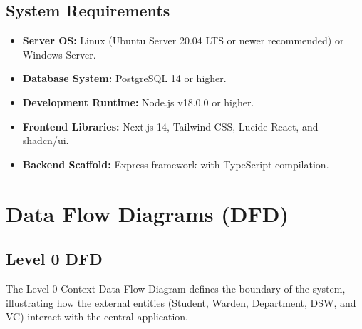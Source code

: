 \documentclass[12pt,a4paper]{article}
\begin{document}
\subsection{System Requirements}
\begin{itemize}
    \item \textbf{Server OS:} Linux (Ubuntu Server 20.04 LTS or newer recommended) or Windows Server.
    \item \textbf{Database System:} PostgreSQL 14 or higher.
    \item \textbf{Development Runtime:} Node.js v18.0.0 or higher.
    \item \textbf{Frontend Libraries:} Next.js 14, Tailwind CSS, Lucide React, and shadcn/ui.
    \item \textbf{Backend Scaffold:} Express framework with TypeScript compilation.
\end{itemize}

\newpage
\section{Data Flow Diagrams (DFD)}

\subsection{Level 0 DFD}
The Level 0 Context Data Flow Diagram defines the boundary of the system, illustrating how the external entities (Student, Warden, Department, DSW, and VC) interact with the central application.
\end{document}
